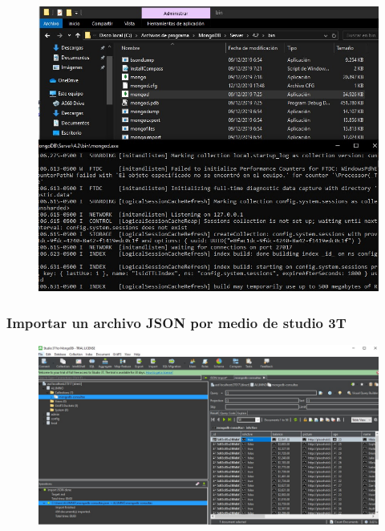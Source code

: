 \documentclass[preprint,12pt]{elsarticle}
\begin{document}
\begin{figure}[H]
	\begin{center}
		\includegraphics[width=12cm]{./IMAGENES/3} 
	\end{center}
\end{figure}

\subsubsection{\textbf{Importar un archivo JSON por medio de studio 3T}}
\begin{figure}[H]
	\begin{center}
		\includegraphics[width=12cm]{./IMAGENES/4} 
	\end{center}
\end{figure}
\end{document}
